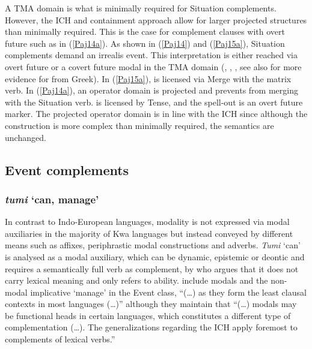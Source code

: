 \documentclass[output=paper]{langscibook}
\begin{document}
A TMA domain is what is minimally required for Situation complements. However, the ICH and containment approach allow for larger projected structures than minimally required. This is the case for complement clauses with overt future such as in (\ref{Paj14a}). As shown in (\ref{Paj14}) and (\ref{Paj15a}), Situation complements demand an irrealis event. This interpretation is either reached via overt future or a covert future modal  in the TMA domain (\citealt{todorovickwurmbrand2020}, \citealt{wurmbrand2014a}, \citealt{todorovic2015}, see also \citet{wurmbrandlohninger2020} for more evidence for  from Greek). In (\ref{Paj15a}),  is licensed via Merge with the matrix verb. In (\ref{Paj14a}), an operator domain is projected and prevents  from merging with the Situation verb.  is licensed by Tense, and the spell-out is an overt future marker. The projected operator domain is in line with the ICH since although the construction is more complex than minimally required, the semantics are unchanged.  

\subsection{Event complements}\label{Pajsect:3.3}

\subsubsection{\textit{tumi} `can, manage'}

In contrast to Indo-European languages, modality is not expressed via modal auxiliaries in the majority of Kwa languages but instead conveyed by different means such as affixes, periphrastic modal constructions and adverbs. \emph{Tumi} ‘can’ is analysed as a modal auxiliary, which can be dynamic, epistemic or deontic and requires a semantically full verb as complement, by \citet{owusu2014} who argues that it does not carry lexical meaning and only refers to ability. \citet{wurmbrandlohninger2020} include modals and the non-modal implicative ‘manage’ in the Event class, “(…) as they form the least clausal contexts in most languages (…)” although they maintain that “(…) modals may be functional heads in certain languages, which constitutes a different type of complementation (…). The generalizations regarding the ICH apply foremost to complements of lexical verbs.”

\begin{exe}

\end{exe}
\end{document}
